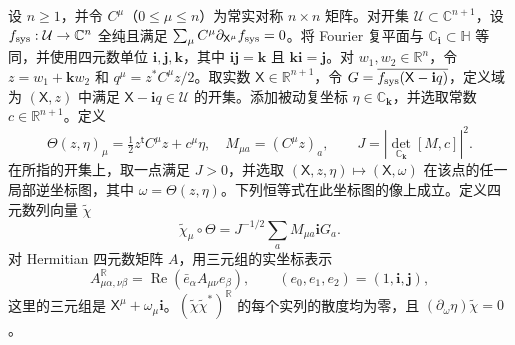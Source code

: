 设 $n\ge1$，并令 $C^\mu$（$0\le\mu\le n$）为常实对称 $n\times n$ 矩阵。对开集 $\mathcal U\subset\mathbb C^{n+1}$，设 $f_{\rm sys}:\mathcal U\to\mathbb C^n$ 全纯且满足 $\sum_\mu C^\mu\partial_{\mathsf X^\mu}f_{\rm sys}=0$。将 Fourier 复平面与 $\mathbb C_{\mathbf i}\subset\mathbb H$ 等同，并使用四元数单位 $\mathbf i,\mathbf j,\mathbf k$，其中 $\mathbf{ij}=\mathbf k$ 且 $\mathbf{ki}=\mathbf j$。对 $w_1,w_2\in\mathbb R^n$，令 $z=w_1+\mathbf k w_2$ 和 $q^\mu=z^*C^\mu z/2$。取实数 $\mathsf X\in\mathbb R^{n+1}$，令 $G=\overline{f_{\rm sys}(\mathsf X-\mathbf i q)}$，定义域为 $(\mathsf X,z)$ 中满足 $\mathsf X-\mathbf i q\in\mathcal U$ 的开集。添加被动复坐标 $\eta\in\mathbb C_{\mathbf k}$，并选取常数 $c\in\mathbb R^{n+1}$。定义
\[
\Theta(z,\eta)_\mu=\tfrac12z^{\mathsf t}C^\mu z+c^\mu\eta,\quad
M_{\mu a}=(C^\mu z)_a,\qquad J=|\det_{\mathbb C_{\mathbf k}}[M,c]|^2.
\]
在所指的开集上，取一点满足 $J>0$，并选取 $(\mathsf X,z,\eta)\mapsto(\mathsf X,\omega)$ 在该点的任一局部逆坐标图，其中 $\omega=\Theta(z,\eta)$。下列恒等式在此坐标图的像上成立。定义四元数列向量 $\widetilde\chi$
\[
\widetilde\chi_\mu\circ\Theta=J^{-1/2}\sum_aM_{\mu a}\mathbf i G_a.
\]
对 Hermitian 四元数矩阵 $A$，用三元组的实坐标表示
\[
A^{\mathbb R}_{\mu\alpha,\nu\beta}=\operatorname{Re}(\bar e_\alpha A_{\mu\nu}e_\beta),
\qquad(e_0,e_1,e_2)=(1,\mathbf i,\mathbf j),
\]
这里的三元组是 $\mathsf X^\mu+\omega_\mu\mathbf i$。$(\widetilde\chi\widetilde\chi^*)^{\mathbb R}$ 的每个实列的散度均为零，且 $(\partial_\omega\eta)\widetilde\chi=0$。
